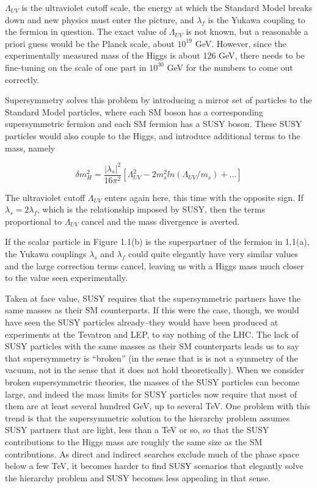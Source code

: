$\Lambda_{UV}$ is the ultraviolet cutoff scale, the energy at which 
the Standard Model breaks down and new physics must enter the picture, and 
$\lambda_f$ is the Yukawa coupling to the fermion in question.  The 
exact value of $\Lambda_{UV}$ is not known, but a reasonable 
a priori guess would be the Planck scale, about $10^{19}$ 
GeV.  However, since the experimentally measured mass of the Higgs is about 126 
GeV, there needs to be fine-tuning on the scale of one part in  
$10^{30}$ GeV for the numbers to come out correctly.

Supersymmetry solves this problem by introducing a mirror set of particles to the Standard Model 
particles, where each SM boson has a corresponding supersymmetric fermion and each SM fermion 
has a SUSY boson.  These SUSY particles would also couple to the Higgs, 
and introduce additional terms to the mass, namely

\begin{equation}
	\delta m_H^2 = \frac{|\lambda_s |^2}{16\pi^2}[\Lambda_{UV}^2-2m_s^2ln(\Lambda_{UV}/m_s)+\ldots]
\end{equation}

The ultraviolet cutoff $\Lambda_{UV}$ enters again here, this time with 
the opposite sign.  If $\lambda_s = 2\lambda_f$, which is the relationship 
imposed by SUSY, then the terms proportional to $\Lambda_{UV}$ cancel and the
mass divergence is averted.

If the scalar particle in Figure 1.1(b) is the superpartner of the fermion in 1.1(a),
the Yukawa couplings $\lambda_s$ and $\lambda_f$ could quite elegantly have very 
similar values and the large correction terms cancel, leaving us with a Higgs mass
much closer to the value seen experimentally. 

Taken at face value, SUSY requires that the supersymmetric partners have the same masses 
as their SM counterparts.  If this were the case, though, we would 
have seen the SUSY particles already--they would have been produced at experiments
at the Tevatron and LEP, to say nothing of the LHC.
The lack of SUSY particles with the same masses as their SM counterparts 
leads us to say that supersymmetry is ``broken'' (in the sense 
that is is not a symmetry of the vacuum, not in the sense that 
it does not hold theoretically).  When we consider broken supersymmetric theories, the 
masses of the SUSY particles can become large, and indeed the mass limits for 
SUSY particles now require that most of them are at least several hundred GeV, up 
to several TeV.  One problem with this trend is that the supersymmetric solution to 
the hierarchy problem assumes SUSY partners that are light, less than a TeV or 
so, so that the SUSY contributions to the Higgs mass are roughly the same 
size as the SM contributions.  As direct and indirect searches exclude much of the 
phase space below a few TeV, it becomes harder to find SUSY scenarios that 
elegantly solve the hierarchy problem and SUSY becomes less appealing in that sense. 

